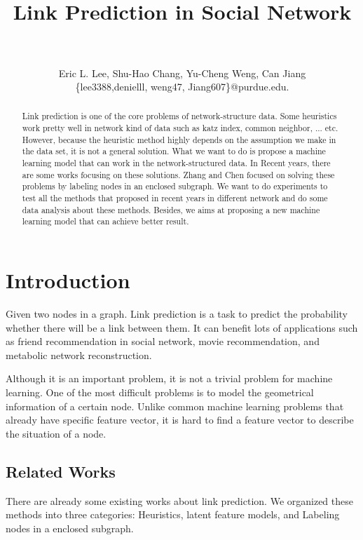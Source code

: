 \documentclass[paper=letter, fontsize=12pt]{scrartcl} %
\title{	
\normalfont \normalsize 
\horrule{2pt} \\[0.4cm] %
{\LARGE Link Prediction in Social Network} \\ %
\horrule{1pt} \\[0.5cm] %
}
\author{\large{Eric L. Lee, Shu-Hao Chang, Yu-Cheng Weng, Can Jiang}\\
  \normalsize{\{lee3388,denielll, weng47, Jiang607\}@purdue.edu.}
} %
\date{} %
\begin{document}
\maketitle %

\begin{abstract}
  Link prediction is one of the core problems of network-structure data. Some heuristics work pretty well in network kind of data such as katz index\cite{katz}, common neighbor, ... etc. However, because the heuristic method highly depends on the assumption we make in the data set, it is not a general solution. What we want to do is propose a machine learning model that can work in the network-structured data. In Recent years, there are some works focusing on these solutions. Zhang and Chen \cite{lpnn} \cite{wlnn} focused on solving these problems by labeling nodes in an enclosed subgraph. We want to do experiments to test all the methods that proposed in recent years in different network and do some data analysis about these methods. Besides, we aims at proposing a new machine learning model that can achieve better result.
\end{abstract}

\section{Introduction}
Given two nodes in a graph. Link prediction is a task to predict the probability whether there will be a link between them. It can benefit lots of applications such as friend recommendation in social network, movie recommendation, and metabolic network reconstruction.

Although it is an important problem, it is not a trivial problem for machine learning. One of the most difficult problems is to model the geometrical information of a certain node. Unlike common machine learning problems that already have specific feature vector, it is hard to find a feature vector to describe the situation of a node.

\subsection {Related Works}
There are already some existing works about link prediction. We organized these methods into three categories: Heuristics, latent feature models, and  Labeling nodes in a enclosed subgraph.
\end{document}
